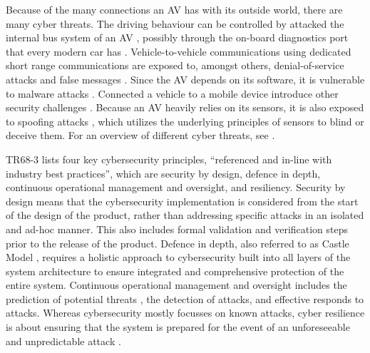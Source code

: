 Because of the many connections an AV has with its outside world, there are many cyber threats. The driving behaviour can be controlled by attacked the internal bus system of an AV \cite{wolf2004security}, possibly through the on-board diagnostics port that every modern car has \cite{checkoway2011comprehensive}. Vehicle-to-vehicle communications using dedicated short range communications are exposed to, amongst others, denial-of-service attacks \cite{lyamin2014real} and false messages \cite{moalla2012risk}. Since the AV depends on its software, it is vulnerable to malware attacks \cite{zhang2014defending}. Connected a vehicle to a mobile device introduce other security challenges \cite{yan2015twoyear, oka2014bluetooth}. Because an AV heavily relies on its sensors, it is also exposed to spoofing attacks \cite{yan2016can, davidson2016controlling}, which utilizes the underlying principles of sensors to blind or deceive them. For an overview of different cyber threats, see \cite{cui2018review, hashemeiza2017sharks, studnia2013survey, yaugdereli2015study, vanderheijden2016survey, sakiz2017survey, zheng2016investigating}. 

TR68-3 \cite[p.~12]{tr68cybersecurity} lists four key cybersecurity principles, ``referenced and in-line with industry best practices'', which are security by design, defence in depth, continuous operational management and oversight, and resiliency. Security by design \cite{ross2018systems, chattopadhyay2018autonomous} means that the cybersecurity implementation is considered from the start of the design of the product, rather than addressing specific attacks in an isolated and ad-hoc manner. This also includes formal validation and verification steps prior to the release of the product. Defence in depth, also referred to as Castle Model \cite{leuprecht2016beyond}, requires a holistic approach to cybersecurity built into all layers of the system architecture to ensure integrated and comprehensive protection of the entire system. Continuous operational management and oversight includes the prediction of potential threats \cite{gandotra2015computational}, the detection of attacks, and effective responds to attacks. Whereas cybersecurity mostly focusses on known attacks, cyber resilience is about ensuring that the system is prepared for the event of an unforeseeable and unpredictable attack \cite{sharkov2016cybersecurity}.

